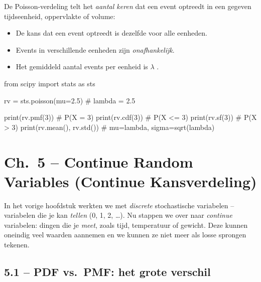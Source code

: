 \documentclass[a4paper,11pt]{article}
\begin{document}
\begin{conceptbox}
De Poisson-verdeling telt het \emph{aantal keren} dat een event optreedt in een gegeven tijdseenheid, oppervlakte of volume:
\begin{itemize}
  \item De kans dat een event optreedt is dezelfde voor alle eenheden.
  \item Events in verschillende eenheden zijn \emph{onafhankelijk}.
  \item Het gemiddeld aantal events per eenheid is $\lambda$ .
\end{itemize}
\end{conceptbox}



\newpage

\begin{pyblock}
from scipy import stats as sts

rv = sts.poisson(mu=2.5)           # lambda = 2.5

print(rv.pmf(3))                   # P(X = 3)
print(rv.cdf(3))                   # P(X <= 3)
print(rv.sf(3))                    # P(X > 3)
print(rv.mean(), rv.std())         # mu=lambda, sigma=sqrt(lambda)
\end{pyblock}
\section{Ch.\ 5 -- Continue Random Variables (Continue Kansverdeling)}

In het vorige hoofdstuk werkten we met \emph{discrete} stochastische variabelen -- variabelen die je kan \emph{tellen} (0, 1, 2, \ldots). Nu stappen we over naar \emph{continue} variabelen: dingen die je \emph{meet}, zoals tijd, temperatuur of gewicht. Deze kunnen oneindig veel waarden aannemen en we kunnen ze niet meer als losse sprongen tekenen.

\subsection{5.1 -- PDF vs.\ PMF: het grote verschil}
\end{document}
